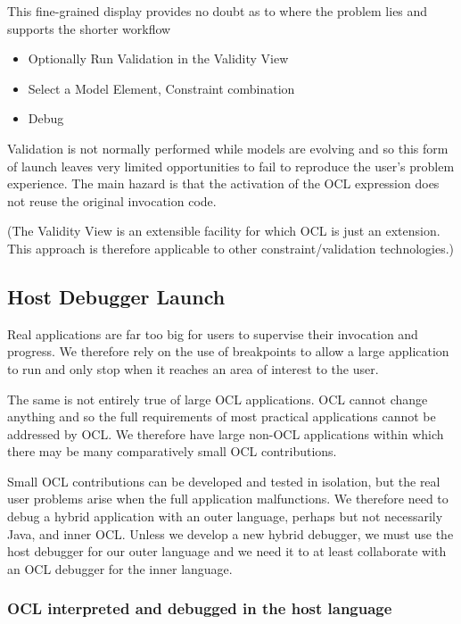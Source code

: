 \documentclass[a4paper]{article}
\begin{document}
This fine-grained display provides no doubt as to where the problem lies and supports the shorter workflow

\begin{itemize}
\item Optionally Run Validation in the Validity View
\item Select a Model Element, Constraint combination
\item Debug
\end{itemize}

Validation is not normally performed while models are evolving and so this form of launch leaves very limited opportunities to fail to reproduce the user's problem experience. The main hazard is that the activation of the OCL expression does not reuse the original invocation code.

(The Validity View is an extensible facility for which OCL is just an extension. This approach is therefore applicable to other constraint/validation technologies.)

\subsection{Host Debugger Launch}

Real applications are far too big for users to supervise their invocation and progress. We therefore rely on the use of breakpoints to allow a large application to run and only stop when it reaches an area of interest to the user.

The same is not entirely true of large OCL applications. OCL cannot change anything and so the full requirements of most practical applications cannot be addressed by OCL. We therefore have large non-OCL applications within which there may be many comparatively small OCL contributions. 

Small OCL contributions can be developed and tested in isolation, but the real user problems arise when the full application malfunctions. We therefore need to debug a hybrid application with an outer language, perhaps but not necessarily Java, and inner OCL. Unless we develop a new hybrid debugger, we must use the host debugger for our outer language and we need it to at least collaborate with an OCL debugger for the inner language.

\subsubsection{OCL interpreted and debugged in the host language}
\end{document}
